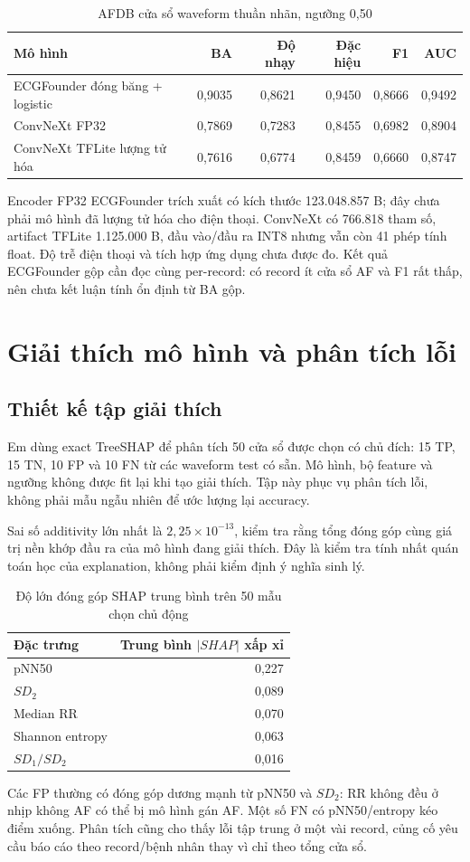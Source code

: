 \documentclass[12pt,a4paper,oneside]{report}
\begin{document}
\begin{table}[H]
\centering\small
\caption{AFDB cửa sổ waveform thuần nhãn, ngưỡng 0,50}
\begin{tabular}{lrrrrr}
\toprule Mô hình & BA & Độ nhạy & Đặc hiệu & F1 & AUC\\\midrule
ECGFounder đóng băng + logistic & 0,9035 & 0,8621 & 0,9450 & 0,8666 & 0,9492\\
ConvNeXt FP32 & 0,7869 & 0,7283 & 0,8455 & 0,6982 & 0,8904\\
ConvNeXt TFLite lượng tử hóa & 0,7616 & 0,6774 & 0,8459 & 0,6660 & 0,8747\\
\bottomrule
\end{tabular}
\end{table}
Encoder FP32 ECGFounder trích xuất có kích thước 123.048.857 B; đây chưa phải mô hình đã lượng tử hóa cho điện thoại. ConvNeXt có 766.818 tham số, artifact TFLite 1.125.000 B, đầu vào/đầu ra INT8 nhưng vẫn còn 41 phép tính float. Độ trễ điện thoại và tích hợp ứng dụng chưa được đo. Kết quả ECGFounder gộp cần đọc cùng per-record: có record ít cửa sổ AF và F1 rất thấp, nên chưa kết luận tính ổn định từ BA gộp.

\chapter{Giải thích mô hình và phân tích lỗi}
\section{Thiết kế tập giải thích}
Em dùng exact TreeSHAP để phân tích 50 cửa sổ được chọn có chủ đích: 15 TP, 15 TN, 10 FP và 10 FN từ các waveform test có sẵn. Mô hình, bộ feature và ngưỡng không được fit lại khi tạo giải thích. Tập này phục vụ phân tích lỗi, không phải mẫu ngẫu nhiên để ước lượng lại accuracy.

Sai số additivity lớn nhất là $2{,}25\times10^{-13}$, kiểm tra rằng tổng đóng góp cùng giá trị nền khớp đầu ra của mô hình đang giải thích. Đây là kiểm tra tính nhất quán toán học của explanation, không phải kiểm định ý nghĩa sinh lý.

\begin{table}[H]
\centering
\caption{Độ lớn đóng góp SHAP trung bình trên 50 mẫu chọn chủ động}
\begin{tabular}{lr}
\toprule Đặc trưng & Trung bình $|SHAP|$ xấp xỉ\\\midrule
pNN50 & 0,227\\
$SD_2$ & 0,089\\
Median RR & 0,070\\
Shannon entropy & 0,063\\
$SD_1/SD_2$ & 0,016\\
\bottomrule
\end{tabular}
\end{table}
Các FP thường có đóng góp dương mạnh từ pNN50 và $SD_2$: RR không đều ở nhịp không AF có thể bị mô hình gán AF. Một số FN có pNN50/entropy kéo điểm xuống. Phân tích cũng cho thấy lỗi tập trung ở một vài record, củng cố yêu cầu báo cáo theo record/bệnh nhân thay vì chỉ theo tổng cửa sổ.
\end{document}
